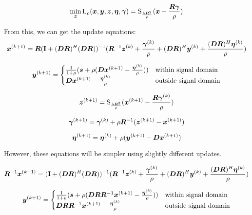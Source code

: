 \documentclass{article}
\begin{document}
\begin{equation}
\min_{\bm{z}} \operatorname{L}_{\rho}(\bm{x},\bm{y},\bm{z},\bm{\eta},\bm{\gamma}) = \operatorname{S}_{\frac{\lambda\bm{R}^2}{\rho}}(\bm{x} - \frac{\bm{R}\bm{\gamma}}{\rho})
\end{equation}

From this, we can get the update equations:
\begin{equation}
\bm{x}^{(k + 1)} = \bm{R}({\bf I} + (\bm{D}\bm{R})^H(\bm{D}\bm{R}))^{-1}(\bm{R}^{-1}\bm{z}^{(k)} + \frac{\bm{\gamma}^{(k)}}{\rho} + (\bm{D}\bm{R})^H\bm{y}^{(k)} + \frac{(\bm{D}\bm{R})^H\bm{\eta}^{(k)}}{\rho})
\end{equation}

\begin{equation}
\bm{y}^{(k + 1)}= \begin{cases}
\frac{1}{1 + \rho}(\bm{s} + \rho(\bm{D}\bm{x}^{(k + 1)} - \frac{\bm{\eta}^{(k)}}{\rho})) & \text{within signal domain}\\
\bm{D}\bm{x}^{(k + 1)} - \frac{\bm{\eta}^{(k)}}{\rho} & \text{outside signal domain}
\end{cases}
\end{equation}

\begin{equation}
\bm{z}^{(k + 1)}= \operatorname{S}_{\frac{\lambda\bm{R}^2}{\rho}}(\bm{x}^{(k+1)} - \frac{\bm{R}\bm{\gamma}^{(k)}}{\rho})
\end{equation}

\begin{equation}
\bm{\gamma}^{(k + 1)} = \bm{\gamma}^{(k)} + \rho\bm{R}^{-1}(\bm{z}^{(k + 1)} - \bm{x}^{(k + 1)})
\end{equation}

\begin{equation}
\bm{\eta}^{(k + 1)} = \bm{\eta}^{(k)} + \rho(\bm{y}^{(k + 1)} - \bm{D}\bm{x}^{(k + 1)})
\end{equation}

However, these equations will be simpler using slightly different updates.

\begin{equation}
\bm{R}^{-1}\bm{x}^{(k + 1)} = ({\bf I} + (\bm{D}\bm{R})^H(\bm{D}\bm{R}))^{-1}(\bm{R}^{-1}\bm{z}^{(k)} + \frac{\bm{\gamma}^{(k)}}{\rho} + (\bm{D}\bm{R})^H\bm{y}^{(k)} + \frac{(\bm{D}\bm{R})^H\bm{\eta}^{(k)}}{\rho})
\end{equation}

\begin{equation}
\bm{y}^{(k + 1)}= \begin{cases}
\frac{1}{1 + \rho}(\bm{s} + \rho(\bm{D}\bm{R}\bm{R}^{-1}\bm{x}^{(k + 1)} - \frac{\bm{\eta}^{(k)}}{\rho})) & \text{within signal domain}\\
\bm{D}\bm{R}\bm{R}^{-1}\bm{x}^{(k + 1)} - \frac{\bm{\eta}^{(k)}}{\rho} & \text{outside signal domain}
\end{cases}
\end{equation}
\end{document}
